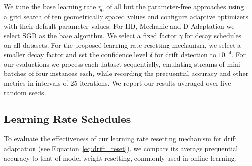 \documentclass{article} %
\begin{document}
We tune the base learning rate $\eta_0$ of all but the parameter-free approaches using a grid search of ten geometrically spaced values and configure adaptive optimizers with their default parameter values. For HD, Mechanic and D-Adaptation we select SGD as the base algorithm.
We select a fixed factor $\gamma$ for decay schedules on all datasets.
For the proposed learning rate resetting mechanism, we select a smaller decay factor and set the confidence level $\delta$ for drift detection to $10^{-4}$.
For our evaluations we process each dataset sequentially, emulating streams of mini-batches of four instances each, while recording the prequential accuracy and other metrics in intervals of 25 iterations.
We report our results averaged over five random seeds.

\subsection{Learning Rate Schedules}

To evaluate the effectiveness of our learning rate resetting mechanism for drift adaptation (see Equation~\eqref{eq:drift_reset}), we compare its average prequential accuracy to that of model weight resetting, commonly used in online learning.
\end{document}
